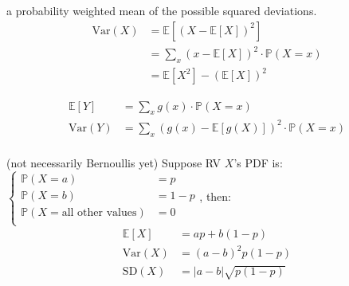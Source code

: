 \documentclass[10pt,landscape]{article}
\newcommand{\Red}[1]{\noindent{\textbf{\textcolor{BrickRed}{#1 -}}}}
\newcommand{\Green}[1]{\noindent{\textbf{\textcolor{PineGreen}{#1 -}}}}
\begin{document}
\begin{multicols}{4}
\Red{Expected Value} 

\Red{Variance} a probability weighted mean of the possible squared deviations.
\begin{displaymath}
    \boxed{
        \begin{aligned}
            \text{Var}(X) &= \mathbb{E}\left[(X - \mathbb{E}[X])^2\right]\\
            &= \sum_x (x - \mathbb{E}[X])^2 \cdot \mathbb{P}(X = x) \\
            &= \mathbb{E}\left[X^2\right] - \left(\mathbb{E}\left[X\right]\right)^2
        \end{aligned}
    }
\end{displaymath}

\Red{Standard Deviation} 

\Green{Given $Y = g(X)$ and $X$'s PDF}
\begin{displaymath}
    \boxed{
        \begin{aligned}
            \mathbb{E}\left[Y\right] &= \sum_x g(x) \cdot \mathbb{P}(X = x) \\
            \text{Var}(Y) &= \sum_x \left(g(x) - \mathbb{E}\left[g(X)\right]\right)^2 \cdot \mathbb{P}(X = x) \\
        \end{aligned}
    }
\end{displaymath}

\Red{RVs with only 2 outcomes} (not necessarily Bernoullis yet)
Suppose RV $X$'s PDF is: $\begin{cases}
    \mathbb{P}(X = a) &= p \\
    \mathbb{P}(X = b) &= 1- p \\
    \mathbb{P}(X = \text{all other values}) &= 0 \\
\end{cases}$, then:
\begin{displaymath}
    \boxed{
        \begin{aligned}
            \mathbb{E}\left[X\right] &= ap + b(1-p) \\
            \text{Var}(X) &= (a-b)^2p(1-p) \\
            \text{SD}(X) &= |a-b| \sqrt{p (1-p)}
        \end{aligned}
    }
\end{displaymath}


\end{multicols}
\end{document}

